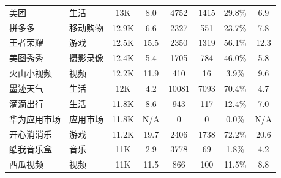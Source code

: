 \begin{ThreePartTable}
\begin{longtable}{l l c c c c c c}
        \rowcolor{gray!15} 美团         & 生活       & 13K                        & 8.0                        & 4752           & 1415                       & 29.8\%       & 6.9                        \\
        拼多多                          & 移动购物   & 12.9K                      & 6.6                        & 2327           & 551                        & 23.7\%       & 7.8                        \\
        \rowcolor{gray!15} 王者荣耀     & 游戏       & 12.5K                      & 15.5                       & 2350           & 1319                       & 56.1\%       & 12.3                       \\
        美图秀秀                        & 摄影录像   & 12.4K                      & 5.4                        & 1705           & 784                        & 46.0\%       & 5.8                        \\
        \rowcolor{gray!15} 火山小视频   & 视频       & 12.2K                      & 11.9                       & 410            & 16                         & 3.9\%        & 9.6                        \\
        墨迹天气                        & 生活       & 12K                        & 4.2                        & 10081          & 7093                       & 70.4\%       & 4.7                        \\
        \rowcolor{gray!15} 滴滴出行     & 生活       & 11.8K                      & 8.6                        & 943            & 117                        & 12.4\%       & 7.0                        \\
        华为应用市场                    & 应用市场   & 11.8K                      & N/A                        & 0              & 0                          & 0.0\%        & N/A                        \\
        \rowcolor{gray!15} 开心消消乐   & 游戏       & 11.2K                      & 19.7                       & 2406           & 1738                       & 72.2\%       & 20.6                       \\
        酷我音乐盒                      & 音乐       & 11K                        & 2.9                        & 3778           & 69                         & 1.8\%        & 4.2                        \\
        \rowcolor{gray!15} 西瓜视频     & 视频       & 11K                        & 11.5                       & 866            & 100                        & 11.5\%       & 8.8                        \\

\end{longtable}
\end{ThreePartTable}
